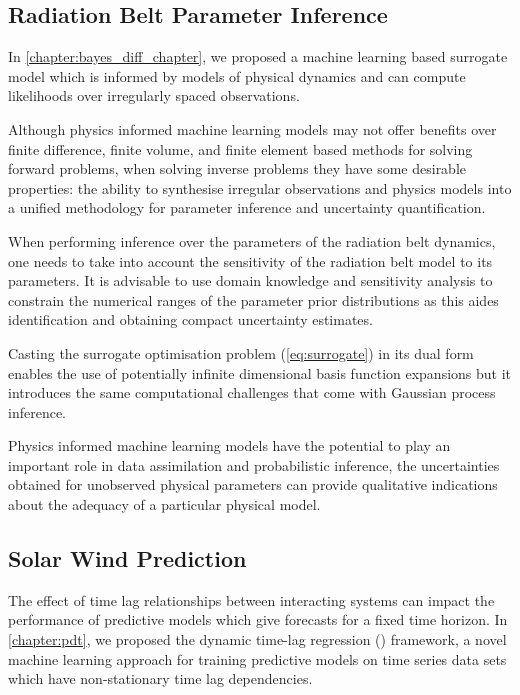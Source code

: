 \subsection*{Radiation Belt Parameter Inference}

In \cref{chapter:bayes_diff_chapter}, we proposed a machine learning based 
surrogate model which is informed by models of physical dynamics and can 
compute likelihoods over irregularly spaced observations.  

Although physics informed machine learning models may not offer benefits over 
finite difference, finite volume, and finite element based methods for solving 
forward problems, when solving inverse problems they have some desirable 
properties: the ability to synthesise irregular observations and physics models 
into a unified methodology for parameter inference and uncertainty 
quantification. 

When performing inference over the parameters of the radiation belt dynamics, 
one needs to take into account the sensitivity of the radiation belt model to 
its parameters. It is advisable to use domain knowledge and sensitivity 
analysis to constrain the numerical ranges of the parameter prior distributions 
as this aides identification and obtaining compact uncertainty estimates.

Casting the surrogate optimisation problem (\cref{eq:surrogate}) in its dual 
form enables the use of potentially infinite dimensional basis function 
expansions but it introduces the same computational challenges that come with 
Gaussian process inference. 

Physics informed machine learning models have the potential to 
play an important role in data assimilation and probabilistic inference, the 
uncertainties obtained for unobserved physical parameters can provide 
qualitative indications about the adequacy of a particular physical model. 

\subsection*{Solar Wind Prediction}

The effect of time lag relationships between interacting systems can impact the 
performance of predictive models which give forecasts for a fixed time horizon. 
In \cref{chapter:pdt}, we proposed the dynamic time-lag regression (\XX) 
framework, a novel machine learning approach for training predictive models on 
time series data sets which have non-stationary time lag dependencies.


